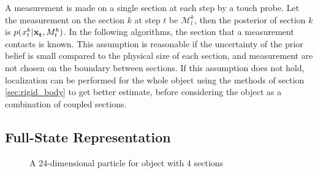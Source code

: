 \documentclass[letterpaper, 10 pt, conference]{ieeeconf}
\newcommand{\maction}{\mathcal{M}}
\newcommand{\measurementSet}{M}
\begin{document}
A measurement is made on a single section at each step by a touch probe.
Let the measurement on the section $k$ at step $t$ be $\maction^k_t$, then the posterior of section $k$ is $p(\particle[t][][k]|\mathbf{\particle[t]}, \measurementSet^k_t)$. 
In the following algorithms, the section that a measurement contacts is known.
This assumption is reasonable if the uncertainty of the prior belief is small compared to the physical size of each section, and measurement are not chosen on the boundary between sections.
If this assumption does not hold, localization can be performed for the whole object using the methods of section \ref{sec:rigid_body} to get better estimate, before considering the object as a combination of coupled sections.


\subsection{Full-State Representation} \label{sec:full state}

\begin{figure}
	\centering
	\caption{A 24-dimensional particle for object with 4 sections}
	\label{fig:full-state}
\end{figure}
\end{document}

